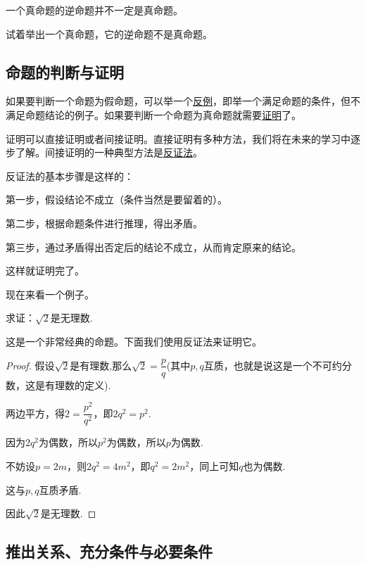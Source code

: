 \documentclass[lang=cn,math=cm,chinesefont=nofont,11pt,scheme=chinese,twocol]{elegantbook}
\begin{document}
\begin{remark}
  一个真命题的逆命题并不一定是真命题。
\end{remark}

\begin{exercise}\label{exer:202405021028}
  试着举出一个真命题，它的逆命题不是真命题。
\end{exercise}


\subsection{命题的判断与证明}

如果要判断一个命题为假命题，可以举一个\underline{反例}，即举一个满足命题的条件，但不满足命题结论的例子。如果要判断一个命题为真命题就需要\underline{证明}了。

证明可以直接证明或者间接证明。直接证明有多种方法，我们将在未来的学习中逐步了解。间接证明的一种典型方法是\underline{反证法}。

反证法的基本步骤是这样的：

第一步，假设结论不成立（条件当然是要留着的）。

第二步，根据命题条件进行推理，得出矛盾。

第三步，通过矛盾得出否定后的结论不成立，从而肯定原来的结论。

这样就证明完了。

\hspace*{\fill}

现在来看一个例子。

\begin{example}
  求证：$\sqrt{2}$是无理数.
\end{example}
这是一个非常经典的命题。下面我们使用反证法来证明它。
\begin{proof}
  假设$\sqrt{2}$是有理数,那么$\sqrt{2}=\dfrac{p}{q}$(其中$p,q$互质，也就是说这是一个不可约分数，这是有理数的定义).

  两边平方，得$2=\dfrac{p^2}{q^2}$，即$2q^2=p^2$.

  因为$2q^2$为偶数，所以$p^2$为偶数，所以$p$为偶数.

  不妨设$p=2m$，则$2q^2=4m^2$，即$q^2=2m^2$，同上可知$q$也为偶数.

  这与$p,q$互质矛盾.

  因此$\sqrt{2}$是无理数.

\end{proof}

\subsection{推出关系、充分条件与必要条件}
\end{document}
